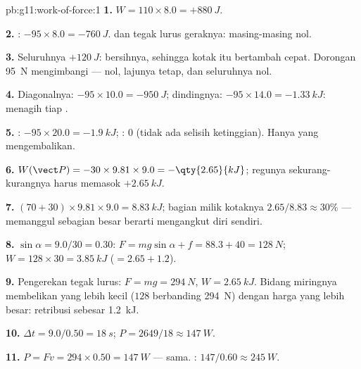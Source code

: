 \begin{solution}{pb:g11:work-of-force:1}
\textbf{1.} $W = 110 \times 8.0 = +\qty{880}{J}$.

\textbf{2.} : $-95 \times 8.0 = -\qty{760}{J}$.  dan
 tegak lurus geraknya: masing-masing nol.

\textbf{3.} Seluruhnya $+\qty{120}{J}$:  bersihnya,
sehingga kotak itu bertambah cepat. Dorongan \qty{95}{N} mengimbangi
 ---  nol, lajunya tetap, dan  seluruhnya
nol.

\textbf{4.} Diagonalnya: $-95 \times 10.0 = -\qty{950}{J}$;
dindingnya: $-95 \times 14.0 = -\qty{1.33}{kJ}$:  menagih tiap
.

\textbf{5.} : $-95 \times 20.0 = -\qty{1.9}{kJ}$; :
$0$ (tidak ada selisih ketinggian). Hanya  yang mengembalikan.

\textbf{6.} $W(\vect P) = -30 \times 9.81 \times 9.0 =
-\qty{2.65}{kJ}$; regunya sekurang-kurangnya harus memasok
$+\qty{2.65}{kJ}$.

\textbf{7.} $(70 + 30) \times 9.81 \times 9.0 = \qty{8.83}{kJ}$;
bagian milik kotaknya $2.65/8.83 \approx 30\%$ --- memanggul sebagian
besar berarti mengangkut diri sendiri.

\textbf{8.} $\sin\alpha = 9.0/30 = 0.30$:
$F = mg\sin\alpha + f = 88.3 + 40 = \qty{128}{N}$;
$W = 128 \times 30 = \qty{3.85}{kJ}$ ($= 2.65 + 1.2$).

\textbf{9.} Pengerekan tegak lurus: $F = mg = \qty{294}{N}$,
$W = \qty{2.65}{kJ}$. Bidang miringnya membelikan  yang lebih kecil
($128$ berbanding \qty{294}{N}) dengan harga  yang lebih besar:
retribusi  sebesar \qty{1.2}{kJ}.

\textbf{10.} $\Delta t = 9.0/0.50 = \qty{18}{s}$;
$P = 2649/18 \approx \qty{147}{W}$.

\textbf{11.} $P = Fv = 294 \times 0.50 = \qty{147}{W}$ --- sama.
: $147/0.60 \approx \qty{245}{W}$.


\end{solution}
